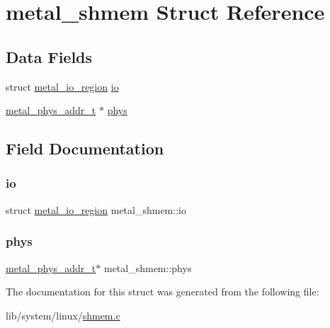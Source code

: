\hypertarget{structmetal__shmem}{}\section{metal\+\_\+shmem Struct Reference}
\label{structmetal__shmem}
\subsection*{Data Fields}
\begin{DoxyCompactItemize}
\item 
struct \hyperlink{structmetal__io__region}{metal\+\_\+io\+\_\+region} \hyperlink{structmetal__shmem_a89b51c685bd1c39a67c998d892c6bea8}{io}
\item 
\hyperlink{group__system_gae024fa10b72199a3e26c29b6eb97df5d}{metal\+\_\+phys\+\_\+addr\+\_\+t} $\ast$ \hyperlink{structmetal__shmem_a6ab7cbbfa74165566f5aad3aac7b0ccb}{phys}
\end{DoxyCompactItemize}


\subsection{Field Documentation}
\mbox{\label{structmetal__shmem_a89b51c685bd1c39a67c998d892c6bea8}} 
\subsubsection{\texorpdfstring{io}{io}}
{\footnotesize\ttfamily struct \hyperlink{structmetal__io__region}{metal\+\_\+io\+\_\+region} metal\+\_\+shmem\+::io}

\mbox{\label{structmetal__shmem_a6ab7cbbfa74165566f5aad3aac7b0ccb}} 
\subsubsection{\texorpdfstring{phys}{phys}}
{\footnotesize\ttfamily \hyperlink{group__system_gae024fa10b72199a3e26c29b6eb97df5d}{metal\+\_\+phys\+\_\+addr\+\_\+t}$\ast$ metal\+\_\+shmem\+::phys}



The documentation for this struct was generated from the following file\+:\begin{DoxyCompactItemize}
\item 
lib/system/linux/\hyperlink{system_2linux_2shmem_8c}{shmem.\+c}\end{DoxyCompactItemize}
